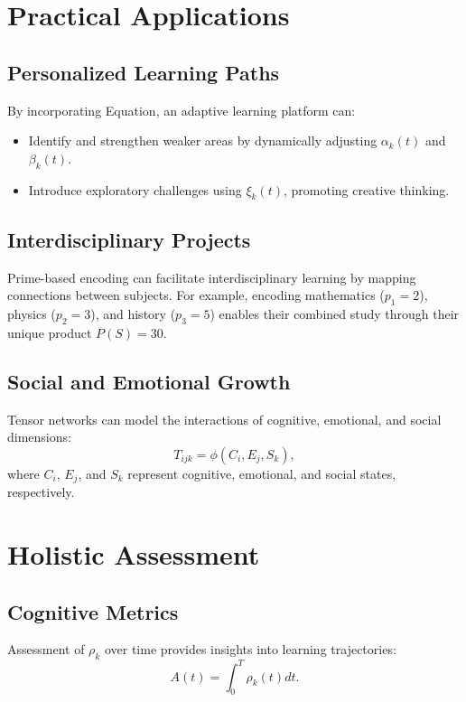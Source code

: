 \documentclass{article}
\theoremstyle{plain}
\begin{document}
\section{Practical Applications}

\subsection{Personalized Learning Paths}
By incorporating Equation, an adaptive learning platform can:
\begin{itemize}
    \item Identify and strengthen weaker areas by dynamically adjusting \( \alpha_k(t) \) and \( \beta_k(t) \).
    \item Introduce exploratory challenges using \( \xi_k(t) \), promoting creative thinking.
\end{itemize}

\subsection{Interdisciplinary Projects}
Prime-based encoding can facilitate interdisciplinary learning by mapping connections between subjects. For example, encoding mathematics (\( p_1 = 2 \)), physics (\( p_2 = 3 \)), and history (\( p_3 = 5 \)) enables their combined study through their unique product \( P(S) = 30 \).

\subsection{Social and Emotional Growth}
Tensor networks can model the interactions of cognitive, emotional, and social dimensions:
\begin{equation}
T_{ijk} = \phi(C_i, E_j, S_k),
\end{equation}
where \( C_i \), \( E_j \), and \( S_k \) represent cognitive, emotional, and social states, respectively.

\section{Holistic Assessment}

\subsection{Cognitive Metrics}
Assessment of \( \rho_k \) over time provides insights into learning trajectories:
\begin{equation}
A(t) = \int_{0}^{T} \rho_k(t) dt.
\end{equation}
\end{document}
